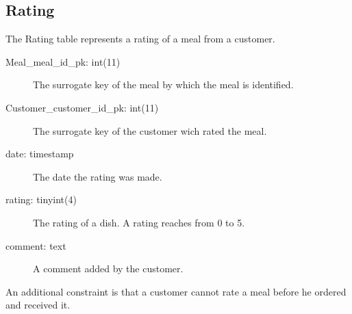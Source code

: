     \subsection{Rating}
    The Rating table represents a rating of a meal from a customer.
    \begin{description}
        \item[Meal\_meal\_id\_pk: int(11)]  The surrogate key of the meal by which the meal is identified.
        \item[Customer\_customer\_id\_pk: int(11)] The surrogate key of the customer wich rated the meal.
        \item[date: timestamp] The date the rating was made.
        \item[rating: tinyint(4)] The rating of a dish. A rating reaches from 0 to 5.
        \item[comment: text] A comment added by the customer.
    \end{description}

    An additional constraint is that a customer cannot rate a meal before he ordered and received it.


